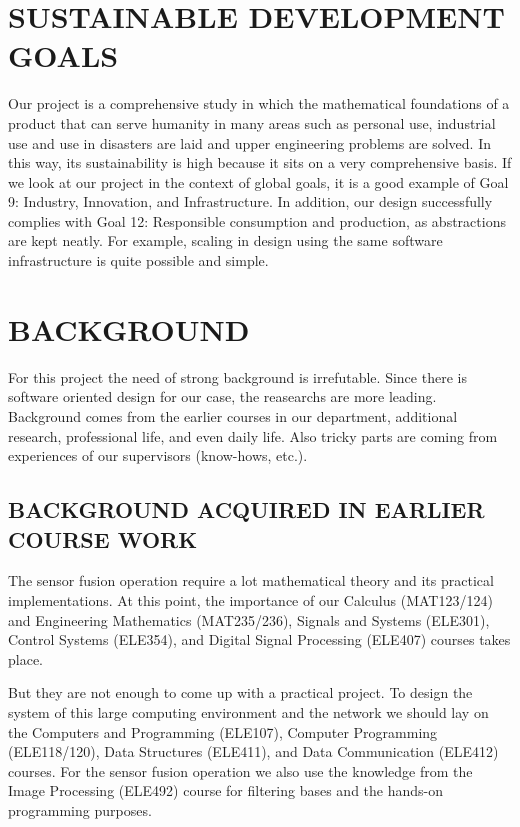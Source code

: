 \documentclass[12pt]{article}
\begin{document}
\section{SUSTAINABLE DEVELOPMENT GOALS}

Our project is a comprehensive study in which the mathematical foundations of a product that can serve humanity in many areas such as personal use, industrial use and use in disasters are laid and upper engineering problems are solved. In this way, its sustainability is high because it sits on a very comprehensive basis. If we look at our project in the context of global goals, it is a good example of Goal 9: Industry, Innovation, and Infrastructure. In addition, our design successfully complies with Goal 12: Responsible consumption and production, as abstractions are kept neatly. For example, scaling in design using the same software infrastructure is quite possible and simple.


\section{BACKGROUND}

For this project the need of strong background is irrefutable. Since there is software oriented design for our case, the reasearchs are more leading. Background comes from the earlier courses in our department, additional research, professional life, and even daily life. Also tricky parts are coming from experiences of our supervisors (know-hows, etc.).

    \subsection{BACKGROUND ACQUIRED IN EARLIER COURSE WORK}

    The sensor fusion operation require a lot mathematical theory and its practical implementations. At this point, the importance of our Calculus (MAT123/124) and Engineering Mathematics (MAT235/236), Signals and Systems (ELE301), Control Systems (ELE354), and Digital Signal Processing (ELE407) courses takes place. 

    But they are not enough to come up with a practical project. To design the system of this large computing environment and the network we should lay on the Computers and Programming (ELE107), Computer Programming (ELE118/120), Data Structures (ELE411), and Data Communication (ELE412) courses. For the sensor fusion operation we also use the knowledge from the Image Processing (ELE492) course for filtering bases and the hands-on programming purposes.
\end{document}

